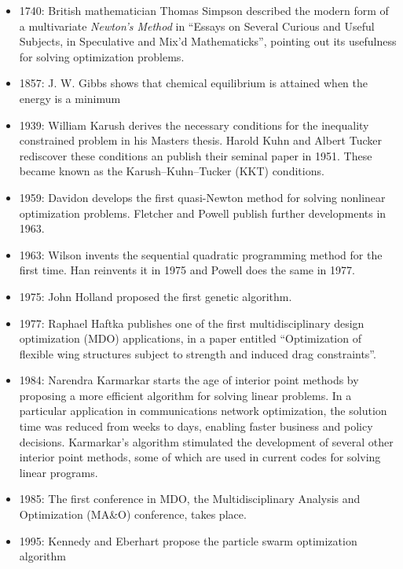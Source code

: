 \documentclass[conf]{new-aiaa}
\begin{document}
    \begin{itemize}[itemsep=1.2em, label={}, itemindent=-2.9em]
        \item 1740: British mathematician Thomas Simpson described the modern form of a multivariate \textit{Newton's Method} in ``Essays on Several Curious and Useful Subjects, in Speculative and Mix'd Mathematicks'', pointing out its usefulness for solving optimization problems. 
        \item 1857: J. W. Gibbs shows that chemical equilibrium is attained when the energy is a minimum
        \item 1939: William Karush derives the necessary conditions for the inequality constrained problem in his Masters thesis. Harold Kuhn and Albert Tucker rediscover these conditions an publish their seminal  
            paper in 1951. These became known as the Karush–Kuhn–Tucker (KKT) conditions.
        \item 1959: Davidon develops the first quasi-Newton method for solving nonlinear optimization problems. Fletcher and Powell publish further developments in 1963.
        \item 1963: Wilson invents the sequential quadratic programming method for the first time. Han reinvents it in 1975 and Powell does the same in 1977.
        \item 1975: John Holland proposed the first genetic algorithm.
        \item 1977: Raphael Haftka publishes one of the first multidisciplinary design optimization (MDO) applications, 
                in a paper entitled “Optimization of flexible wing structures subject to strength and induced drag constraints”.
        \item 1984: Narendra Karmarkar starts the age of interior point methods by proposing a more efficient algorithm for solving linear problems. In a particular application in communications network optimization, the solution time was reduced from weeks to days, enabling faster business and policy decisions. Karmarkar’s algorithm stimulated the development of several other interior point methods, some of which are used in current codes for solving linear programs.
        \item 1985: The first conference in MDO, the Multidisciplinary Analysis and Optimization (MA\&O) conference, takes place.
        \item 1995: Kennedy and Eberhart propose the particle swarm optimization algorithm
    \end{itemize}
\end{document}
